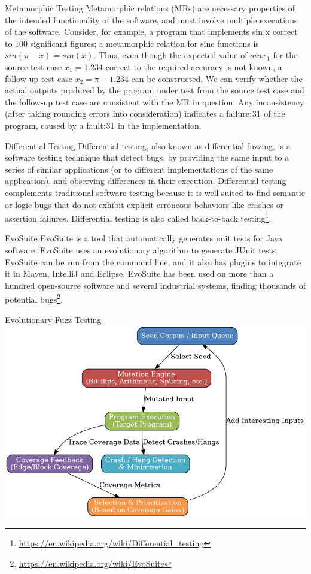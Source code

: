 \documentclass{beamer}
\begin{document}
\begin{frame}[t]{Metamorphic Testing}
Metamorphic relations (MRs) are necessary properties of the intended functionality of the software, and must involve multiple executions of the software. Consider, for example, a program that implements sin x correct to 100 significant figures; a metamorphic relation for sine functions is $sin (\pi − x) = sin(x)$. Thus, even though the expected value of $sin x_1$ for the source test case $x_1 = 1.234$ correct to the required accuracy is not known, a follow-up test case $x_2 = \pi − 1.234$ can be constructed. We can verify whether the actual outputs produced by the program under test from the source test case and the follow-up test case are consistent with the MR in question. Any inconsistency (after taking rounding errors into consideration) indicates a failure: 31  of the program, caused by a fault: 31  in the implementation.
\end{frame}
\begin{frame}[t]{Differential Testing}
    Differential testing, also known as differential fuzzing, is a software testing technique that detect bugs, by providing the same input to a series of similar applications (or to different implementations of the same application), and observing differences in their execution. Differential testing complements traditional software testing because it is well-suited to find semantic or logic bugs that do not exhibit explicit erroneous behaviors like crashes or assertion failures. Differential testing is also called back-to-back testing\footnote{\url{https://en.wikipedia.org/wiki/Differential_testing}}.
\end{frame}

\begin{frame}[t]{EvoSuite}
    EvoSuite is a tool that automatically generates unit tests for Java software. EvoSuite uses an evolutionary algorithm to generate JUnit tests. EvoSuite can be run from the command line, and it also has plugins to integrate it in Maven, IntelliJ and Eclipse. EvoSuite has been used on more than a hundred open-source software and several industrial systems, finding thousands of potential bugs\footnote{\url{https://en.wikipedia.org/wiki/EvoSuite}}.
\end{frame}

\begin{frame}[t]{Evolutionary Fuzz Testing}
    \includegraphics[width=.5\textwidth]{evo_fuzz.png} 
\end{frame}
\end{document}
